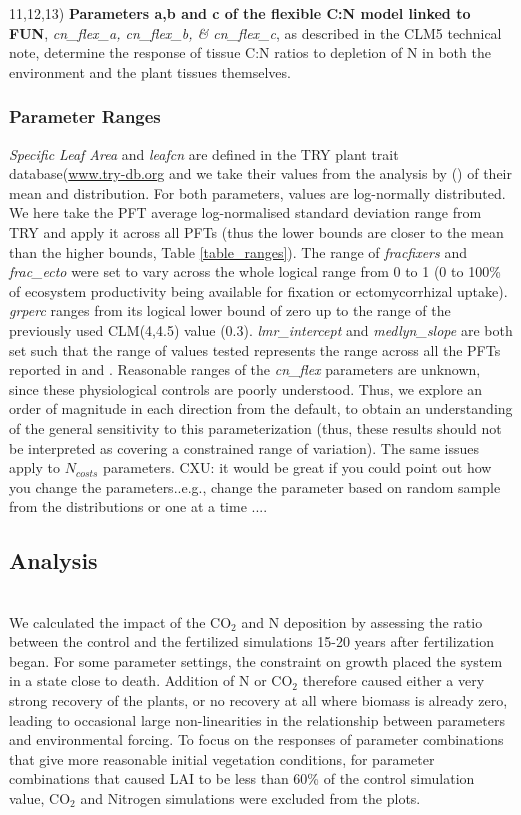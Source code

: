 \documentclass[draft,linenumbers]{agujournal}
\begin{document}
11,12,13) \textbf{Parameters a,b and c of the flexible C:N model linked to FUN}, \emph{cn\_flex\_a, cn\_flex\_b, \& cn\_flex\_c}, as described in the CLM5 technical note, determine the response of tissue C:N ratios to depletion of N in both the environment and the plant tissues themselves.


\subsubsection{Parameter Ranges}
\emph{Specific Leaf Area} and \emph{leafcn} are defined in the TRY plant trait database(\url{www.try-db.org} and we take their values from the analysis by (\cite{kattge2011}) of their mean and distribution. For both parameters, values are log-normally distributed. We here take the PFT average log-normalised standard deviation range from TRY and apply it across all PFTs (thus the lower bounds are closer to the mean than the higher bounds, Table \ref{table_ranges}). The range of \emph{fracfixers} and \emph{frac\_ecto} were set to vary across the whole logical range from 0 to 1 (0 to 100\% of ecosystem productivity being available for fixation or ectomycorrhizal uptake). \emph{grperc} ranges from its logical lower bound of zero up to the range of the previously used CLM(4,4.5) value (0.3). \emph{lmr\_intercept} and \emph{medlyn\_slope} are both set such that the range of values tested represents the range across all the PFTs reported in \cite{atkin2015} and \cite{dekauwe2015}. Reasonable ranges of the \emph{cn\_flex} parameters are unknown, since these physiological controls are poorly understood. Thus, we explore an order of magnitude in each direction from the default, to obtain an understanding of the general sensitivity to this parameterization (thus, these results should not be interpreted as covering a constrained range of variation). The same issues apply to $N_{costs}$ parameters.
{CXU: it would be great if you could point out how you change the parameters..e.g., change the parameter based on random sample from the distributions or one at a time ....}
\subsection{Analysis}\\
We calculated the impact of the CO$_{2}$ and N deposition by assessing the ratio between the control and the fertilized simulations 15-20 years after fertilization began. For some parameter settings, the constraint on growth placed the system in a state close to death. Addition of N or CO$_{2}$ therefore caused either a very strong recovery of the plants, or no recovery at all where biomass is already zero, leading to occasional large non-linearities in the relationship between parameters and environmental forcing. To focus on the responses of parameter combinations that give more reasonable initial vegetation conditions, for parameter combinations that caused LAI to be less than 60\% of the control simulation value, CO$_{2}$ and Nitrogen simulations were excluded from the plots.
\end{document}
